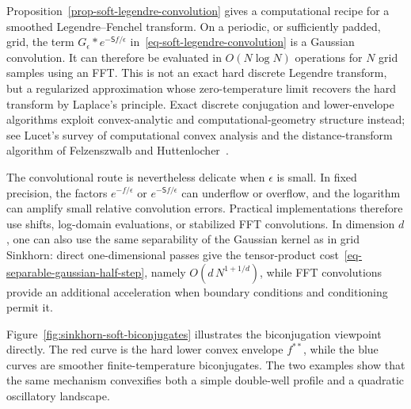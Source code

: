 \begin{rem}\label{rem-soft-legendre-fft}
	Proposition~\ref{prop-soft-legendre-convolution} gives a computational recipe for a smoothed Legendre--Fenchel transform. On a periodic, or sufficiently padded, grid, the term $G_\epsilon\ast e^{-\mathsf S f/\epsilon}$ in~\eqref{eq-soft-legendre-convolution} is a Gaussian convolution. It can therefore be evaluated in $O(N\log N)$ operations for $N$ grid samples using an FFT\@. This is not an exact hard discrete Legendre transform, but a regularized approximation whose zero-temperature limit recovers the hard transform by Laplace's principle. Exact discrete conjugation and lower-envelope algorithms exploit convex-analytic and computational-geometry structure instead; see Lucet's survey of computational convex analysis and the distance-transform algorithm of Felzenszwalb and Huttenlocher~\cite{Lucet2010ComputationalConvexAnalysis,FelzenszwalbHuttenlocher2012DistanceTransforms}.

	The convolutional route is nevertheless delicate when $\epsilon$ is small. In fixed precision, the factors $e^{-f/\epsilon}$ or $e^{-\mathsf S f/\epsilon}$ can underflow or overflow, and the logarithm can amplify small relative convolution errors. Practical implementations therefore use shifts, log-domain evaluations, or stabilized FFT convolutions. In dimension $d$, one can also use the same separability of the Gaussian kernel as in grid Sinkhorn: direct one-dimensional passes give the tensor-product cost~\eqref{eq-separable-gaussian-half-step}, namely $O(d\,N^{1+1/d})$, while FFT convolutions provide an additional acceleration when boundary conditions and conditioning permit it.
\end{rem}

Figure~\ref{fig:sinkhorn-soft-biconjugates} illustrates the biconjugation viewpoint directly. The red curve is the hard lower convex envelope $f^{**}$, while the blue curves are smoother finite-temperature biconjugates. The two examples show that the same mechanism convexifies both a simple double-well profile and a quadratic oscillatory landscape.

